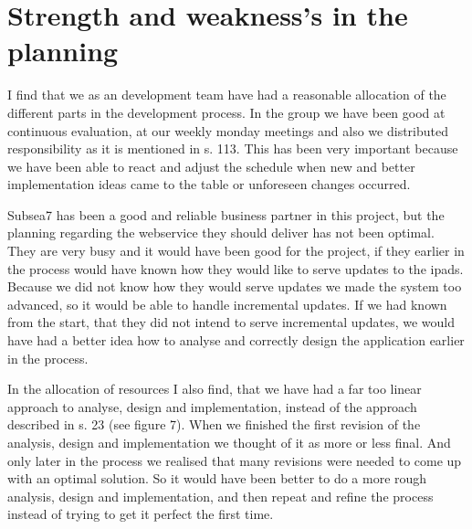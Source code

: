 \section{Strength and weakness's in the planning}
    I find that we as an development team have had a reasonable allocation of
    the different parts in the development process. In the group we have been
    good at continuous evaluation, at our weekly monday meetings and also we
    distributed responsibility as it is mentioned in \cite{oose} s. 113.
    This has been very important because we have been able to react and adjust
    the schedule when new and better implementation ideas came to the
    table or unforeseen changes occurred.

    Subsea7 has been a good and reliable business partner in this project, but
    the planning regarding the webservice they should deliver has not been
    optimal. They are very busy and it would have been good for the project, if
    they earlier in the process would have known how they would like to  serve
    updates to the ipads. Because we did not know how they would serve updates
    we made the system too advanced, so it would be able to handle
    incremental updates. If we had known from the start, that they did not
    intend to serve incremental updates, we would have had a better idea how to
    analyse and correctly design the application earlier in the process.

    In the allocation of resources I also find, that we have had a far too
    linear approach to analyse, design and implementation, instead of the
    approach described in \cite{mad-article} s. 23 (see figure 7). When we
    finished the first revision of the analysis, design and implementation we
    thought of it as more or less final. And only later in the process we
    realised that many revisions were needed to come up with an optimal
    solution. So it would have been better to do a more rough analysis, design and
    implementation, and then repeat and refine the process instead of trying to
    get it perfect the first time.
